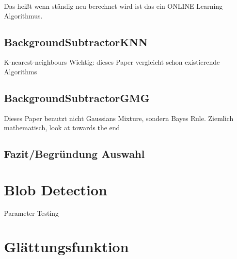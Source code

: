 Das heißt wenn ständig neu berechnet wird ist das ein ONLINE Learning Algorithmus.
\cite{Bowden}
\subsection{BackgroundSubtractorKNN}
K-nearest-neighbours
Wichtig: dieses Paper vergleicht schon existierende Algorithms
\cite{ZIVKOVIC2006773}
\subsection{BackgroundSubtractorGMG}
Dieses Paper benutzt nicht Gaussians Mixture, sondern Bayes Rule. Ziemlich mathematisch, look at towards the end
\cite{6315174}
\subsection{Fazit/Begründung Auswahl}
\section{Blob Detection}
Parameter Testing
\section{Glättungsfunktion}